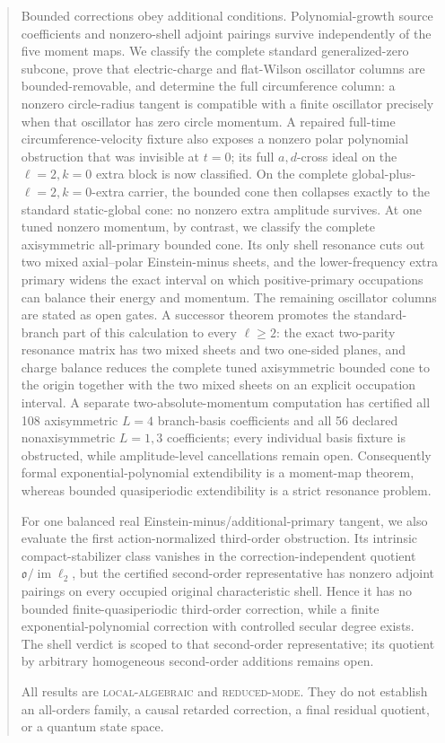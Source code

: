 \documentclass[11pt]{article}
\theoremstyle{definition}
\theoremstyle{remark}
\begin{document}
\begin{abstract}
Bounded corrections obey additional conditions.  Polynomial-growth source
coefficients and nonzero-shell adjoint pairings survive independently of the
five moment maps.  We classify the complete standard generalized-zero
subcone, prove that electric-charge and flat-Wilson oscillator columns are
bounded-removable, and determine the full circumference column: a nonzero
circle-radius tangent is compatible with a finite oscillator precisely when
that oscillator has zero circle momentum.  A repaired full-time
circumference-velocity fixture also exposes a nonzero polar polynomial
obstruction that was invisible at \(t=0\); its full \(a,d\)-cross ideal on
the \(\ell=2,k=0\) extra block is now classified.  On the complete
global-plus-\(\ell=2,k=0\)-extra carrier, the bounded cone then collapses
exactly to the standard static-global cone: no nonzero extra amplitude
survives.  At one tuned nonzero momentum, by contrast, we classify the
complete axisymmetric all-primary bounded cone.  Its only shell resonance
cuts out two mixed axial--polar Einstein-minus sheets, and the lower-frequency
extra primary widens the exact interval on which positive-primary
occupations can balance their energy and momentum.  The remaining oscillator
columns are stated as open gates.  A successor theorem promotes the
standard-branch part of this calculation to every \(\ell\geq2\): the exact
two-parity resonance matrix has two mixed sheets and two one-sided planes,
and charge balance reduces the complete tuned axisymmetric bounded cone to
the origin together with the two mixed sheets on an explicit occupation
interval.  A separate two-absolute-momentum computation has certified all
108 axisymmetric \(L=4\) branch-basis coefficients and all 56 declared
nonaxisymmetric \(L=1,3\) coefficients; every individual basis fixture is
obstructed, while amplitude-level cancellations remain open.
Consequently formal
exponential-polynomial extendibility is a moment-map theorem, whereas
bounded quasiperiodic extendibility is a strict resonance problem.

For one balanced real Einstein-minus/additional-primary tangent, we also
evaluate the first action-normalized third-order obstruction.  Its intrinsic
compact-stabilizer class vanishes in the correction-independent quotient
\(\mathfrak o/\operatorname{im}\ell_2\), but the certified second-order
representative has nonzero adjoint pairings on every occupied original
characteristic shell.  Hence it has no bounded finite-quasiperiodic
third-order correction, while a finite exponential-polynomial correction
with controlled secular degree exists.  The shell verdict is scoped to that
second-order representative; its quotient by arbitrary homogeneous
second-order additions remains open.

All results are \textsc{local-algebraic} and \textsc{reduced-mode}.  They do
not establish an all-orders family, a causal retarded correction, a final
residual quotient, or a quantum state space.
\end{abstract}
\end{document}
